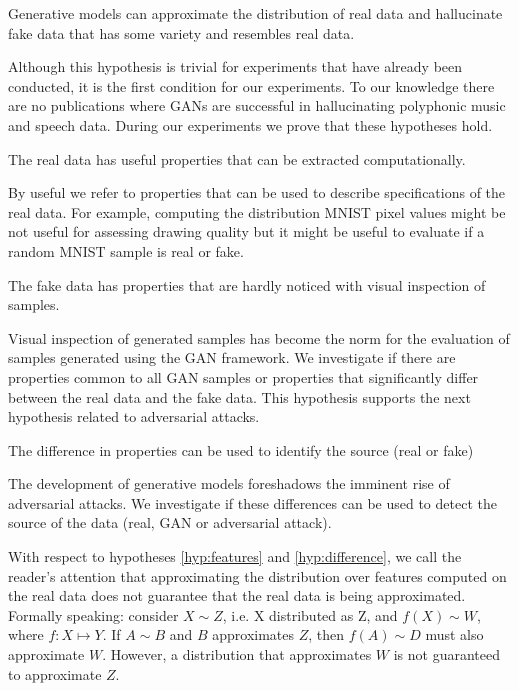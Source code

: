 \begin{hyp} \label{hyp:generate}
Generative models can approximate the distribution of real data and hallucinate
fake data that has some variety and resembles real data. 
\end{hyp}

Although this hypothesis is trivial for experiments that have already been
conducted, it is the first condition for our experiments. To our knowledge 
there are no publications where GANs are successful in hallucinating polyphonic 
music and speech data. During our experiments we prove that these hypotheses hold.

\begin{hyp} \label{hyp:features}
The real data has useful properties that can be extracted computationally.
\end{hyp}
By useful we refer to properties that can be used to describe specifications of the real
data. For example, computing the distribution MNIST pixel values might be not
useful for assessing drawing quality but it might be useful to evaluate
if a random MNIST sample is real or fake.

\begin{hyp} \label{hyp:visual}
The fake data has properties that are hardly noticed with visual inspection of
samples.
\end{hyp}
Visual inspection of generated samples has become the norm for the evaluation of
samples generated using the GAN framework. We investigate if there are
properties common to all GAN samples or properties that significantly differ
between the real data and the fake data. 
This hypothesis supports the next hypothesis related to adversarial attacks. 

\begin{hyp} \label{hyp:difference}
The difference in properties can be used to identify the source (real or fake)
\end{hyp}
The development of generative models foreshadows the imminent
rise of adversarial attacks. We investigate if these differences can be used to
detect the source of the data (real, GAN or adversarial attack). 

With respect to hypotheses \ref{hyp:features} and \ref{hyp:difference}, we call the reader's attention that approximating the distribution over features
computed on the real data does not guarantee that the real data is being
approximated. Formally speaking:
consider $X \sim Z$, i.e. X distributed as Z, and $f(X) \sim W$, where $f: X
\mapsto Y$.
If $A \sim B$ and $B$ approximates $Z$, then $f(A) \sim D$ must also approximate $W$.
However, a distribution that approximates $W$ is not guaranteed to approximate
$Z$.



